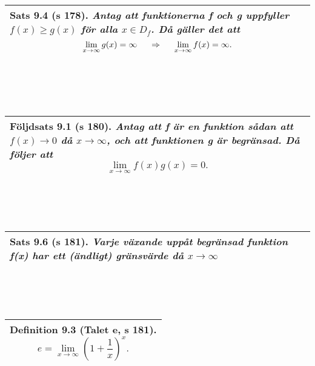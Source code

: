 \documentclass[a4paper]{article}
\begin{document}
\\\\\\
\begin{tabular}{|L{11.5cm}|} \hline
\textbf{Sats 9.4} (s 178).
\textit{Antag att funktionerna f och g uppfyller $f(x)\geq g(x)$ för alla $x \in D_f$. Då gäller det att}
\begin{displaymath}
\lim_{x\rightarrow\infty} g(x) = \infty \hspace{0.5cm} \Rightarrow \hspace{0.5cm} \lim_{x\rightarrow\infty} f(x) = \infty.
\end{displaymath}
\\\hline
\end{tabular}
\\\\\\
\begin{tabular}{|L{11.5cm}|} \hline
\textbf{Följdsats 9.1} (s 180).
\textit{Antag att f är en funktion sådan att $f(x)\rightarrow 0$ då $x\rightarrow \infty$, och att funktionen g är begränsad. Då följer att}
\begin{displaymath}
\lim_{x\rightarrow\infty} f(x)g(x) = 0.
\end{displaymath}
\\\hline
\end{tabular}
\\\\\\
\begin{tabular}{|L{11.5cm}|} \hline
\textbf{Sats 9.6} (s 181).
\textit{Varje växande uppåt begränsad funktion f(x) har ett (ändligt) gränsvärde då $x \rightarrow \infty$}
\vspace{2pt}
\\\hline
\end{tabular}
\\\\\\
\begin{tabular}{|L{11.5cm}|} \hline
\textbf{Definition 9.3} (Talet e, s 181).
\begin{displaymath}
e = \lim_{x\rightarrow\infty}\left( 1+\frac{1}{x}\right)^x.
\end{displaymath}
\\\hline
\end{tabular}
\\\\\\
\end{document}

